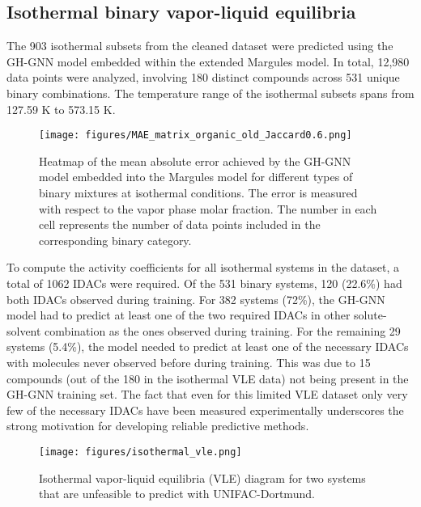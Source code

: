 \label{sec:results_and_discussion}

\subsection{Isothermal binary vapor-liquid equilibria}

The 903 isothermal subsets from the cleaned dataset were predicted using the GH-GNN model embedded within the extended Margules model. In total, 12,980 data points were analyzed, involving 180 distinct compounds across 531 unique binary combinations. The temperature range of the isothermal subsets spans from 127.59 K to 573.15 K.

\begin{figure}[h]
    \centering
    \texttt{[image: figures/MAE\_matrix\_organic\_old\_Jaccard0.6.png]}
    \caption{Heatmap of the mean absolute error achieved by the GH-GNN model embedded into the Margules model for different types of binary mixtures at isothermal conditions. The error is measured with respect to the vapor phase molar fraction. The number in each cell represents the number of data points included in the corresponding binary category.}
    \label{fig:isothermal_map}
\end{figure}

To compute the activity coefficients for all isothermal systems in the dataset, a total of 1062 IDACs were required. Of the 531 binary systems, 120 (22.6\%) had both IDACs observed during training. For 382 systems (72\%), the GH-GNN model had to predict at least one of the two required IDACs in other solute-solvent combination as the ones observed during training. For the remaining 29 systems (5.4\%), the model needed to predict at least one of the necessary IDACs with molecules never observed before during training. This was due to 15 compounds (out of the 180 in the isothermal VLE data) not being present in the GH-GNN training set. The fact that even for this limited VLE dataset only very few of the necessary IDACs have been measured experimentally underscores the strong motivation for developing reliable predictive methods.

\begin{figure}[h]
    \centering
    \texttt{[image: figures/isothermal\_vle.png]}
    \caption{Isothermal vapor-liquid equilibria (VLE) diagram for two systems that are unfeasible to predict with UNIFAC-Dortmund.}
    \label{fig:isothermal_diagram}
\end{figure}

